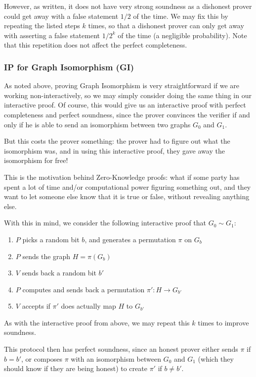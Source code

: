 \documentclass[11pt]{article}
\begin{document}
However, as written, it does not have very strong soundness as a dishonest prover could get away with a false statement \(1/2\) of the time. We may fix this by repeating the listed steps \(k\) times, so that a dishonest prover can only get away with asserting a false statement \(1/2^k\) of the time (a negligible probability). Note that this repetition does not affect the perfect completeness.

\subsubsection{IP for Graph Isomorphism (GI)}

As noted above, proving Graph Isomorphism is very straightforward if we are working non-interactively, so we may simply consider doing the same thing in our interactive proof. Of course, this would give us an interactive proof with perfect completeness and perfect soundness, since the prover convinces the verifier if and only if he is able to send an isomorphism between two graphs \(G_0\) and \(G_1\).\medskip

But this costs the prover something: the prover had to figure out what the isomorphism was, and in using this interactive proof, they gave away the isomorphism for free!\smallskip

 This is the motivation behind Zero-Knowledge proofs: what if some party has spent a lot of time and/or computational power figuring something out, and they want to let someone else know that it is true or false, without revealing anything else.\medskip

\newpage
With this in mind, we consider the following interactive proof that \(G_0\sim G_1\):
\begin{enumerate}
\item \(P\) picks a random bit \(b\), and generates a permutation \(\pi\) on \(G_b\)
\item \(P\) sends the graph \(H=\pi(G_b)\)
\item \(V\) sends back a random bit \(b'\)
\item \(P\) computes and sends back a permutation \(\pi': H\to G_{b'}\)
\item \(V\) accepts if \(\pi'\) does actually map \(H\) to \(G_{b'}\)
\end{enumerate}
As with the interactive proof from above, we may repeat this \(k\) times to improve soundness.\medskip

This protocol then has perfect soundness, since an honest prover either sends \(\pi\) if \(b=b'\), or composes \(\pi\) with an isomorphism between \(G_0\) and \(G_1\) (which they should know if they are being honest) to create \(\pi'\) if \(b\ne b'\).\smallskip
\end{document}
